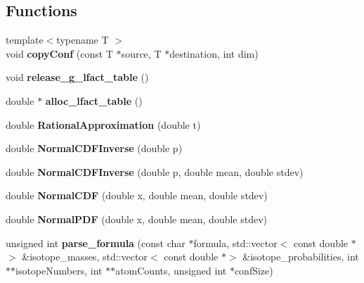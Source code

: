 \subsection*{Functions}
\begin{DoxyCompactItemize}
\item 
\mbox{\label{namespace_iso_spec_a823643c5602bf7f0992eadc3ae472b5a}} 
{\footnotesize template$<$typename T $>$ }\\void {\bfseries copy\+Conf} (const T $\ast$source, T $\ast$destination, int dim)
\item 
\mbox{\label{namespace_iso_spec_a7f5e7376b35b2e0766dfea0d5917baed}} 
void {\bfseries release\+\_\+g\+\_\+lfact\+\_\+table} ()
\item 
\mbox{\label{namespace_iso_spec_a8cd1d93e56c1301eed0d696332fc81a5}} 
double $\ast$ {\bfseries alloc\+\_\+lfact\+\_\+table} ()
\item 
\mbox{\label{namespace_iso_spec_ac766fd9337e208d161395836b9fd9249}} 
double {\bfseries Rational\+Approximation} (double t)
\item 
\mbox{\label{namespace_iso_spec_ac143363e41d73579b72144675ea3ed43}} 
double {\bfseries Normal\+C\+D\+F\+Inverse} (double p)
\item 
\mbox{\label{namespace_iso_spec_a07b909ec7b54fbe3f68c4c3e3cdf9105}} 
double {\bfseries Normal\+C\+D\+F\+Inverse} (double p, double mean, double stdev)
\item 
\mbox{\label{namespace_iso_spec_a80f49da9159a9df06ac64e89d3cef4c8}} 
double {\bfseries Normal\+C\+DF} (double x, double mean, double stdev)
\item 
\mbox{\label{namespace_iso_spec_aaea4e6cc79d5b2185f4b7b905bd2157f}} 
double {\bfseries Normal\+P\+DF} (double x, double mean, double stdev)
\item 
\mbox{\label{namespace_iso_spec_a1cde19132fedfa1686da624baa5e5c35}} 
unsigned int {\bfseries parse\+\_\+formula} (const char $\ast$formula, std\+::vector$<$ const double $\ast$$>$ \&isotope\+\_\+masses, std\+::vector$<$ const double $\ast$$>$ \&isotope\+\_\+probabilities, int $\ast$$\ast$isotope\+Numbers, int $\ast$$\ast$atom\+Counts, unsigned int $\ast$conf\+Size)

\end{DoxyCompactItemize}

